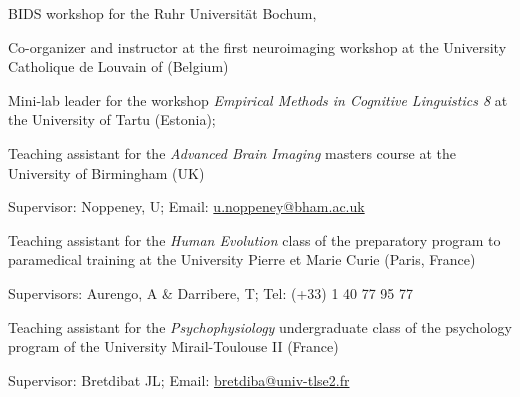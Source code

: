 
BIDS workshop for the Ruhr Universität Bochum,

Co-organizer and instructor at the first neuroimaging workshop at the University Catholique de Louvain of (Belgium)

Mini-lab leader for the workshop \textit{Empirical Methods in Cognitive Linguistics 8} at the University of Tartu (Estonia);

Teaching assistant for the \textit{Advanced Brain Imaging} masters course at the University of Birmingham (UK)

Supervisor: Noppeney, U; Email: \href{mailto:u.noppeney@bham.ac.uk}{u.noppeney@bham.ac.uk}

Teaching assistant for the \textit{Human Evolution} class of the preparatory program to paramedical training at the University Pierre et Marie Curie (Paris, France)

Supervisors: Aurengo, A \& Darribere, T; Tel: (+33) 1 40 77 95 77

Teaching assistant for the \textit{Psychophysiology} undergraduate class of the psychology program of the University Mirail-Toulouse II (France)

Supervisor: Bretdibat JL; Email: \href{mailto:bretdiba@univ-tlse2.fr}{bretdiba@univ-tlse2.fr}
